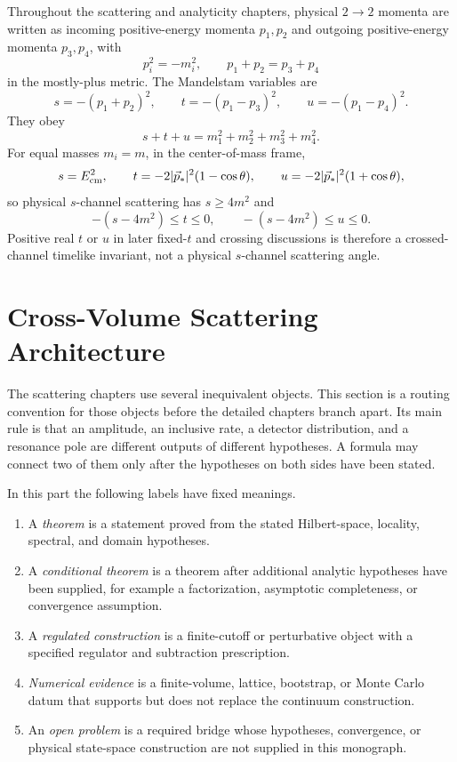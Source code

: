 \begin{definition}
\label{def:mostly-plus-mandelstam-variables}
Throughout the scattering and analyticity chapters, physical \(2\to2\)
momenta are written as incoming positive-energy momenta \(p_1,p_2\) and
outgoing positive-energy momenta \(p_3,p_4\), with
\[
  p_i^2=-m_i^2,
  \qquad
  p_1+p_2=p_3+p_4
\]
in the mostly-plus metric.  The Mandelstam variables are
\[
  s=-(p_1+p_2)^2,\qquad
  t=-(p_1-p_3)^2,\qquad
  u=-(p_1-p_4)^2 .
\]
They obey
\[
  s+t+u=m_1^2+m_2^2+m_3^2+m_4^2 .
\]
For equal masses \(m_i=m\), in the center-of-mass frame,
\[
  s=E_{\rm cm}^2,\qquad
  t=-2|\vec p_*|^2(1-\cos\theta),\qquad
  u=-2|\vec p_*|^2(1+\cos\theta),
\]
so physical \(s\)-channel scattering has \(s\ge4m^2\) and
\[
  -(s-4m^2)\le t\le0,\qquad
  -(s-4m^2)\le u\le0 .
\]
Positive real \(t\) or \(u\) in later fixed-\(t\) and crossing discussions is
therefore a crossed-channel timelike invariant, not a physical
\(s\)-channel scattering angle.
\end{definition}


\section{Cross-Volume Scattering Architecture}
\label{sec:cross-volume-scattering-architecture}

The scattering chapters use several inequivalent objects.  This section is a
routing convention for those objects before the detailed chapters branch
apart.  Its main rule is that an amplitude, an inclusive rate, a detector
distribution, and a resonance pole are different outputs of different
hypotheses.  A formula may connect two of them only after the hypotheses on
both sides have been stated.

\begin{definition}
\label{def:scattering-status-labels}
In this part the following labels have fixed meanings.
\begin{enumerate}
  \item A \emph{theorem} is a statement proved from the stated Hilbert-space,
  locality, spectral, and domain hypotheses.
  \item A \emph{conditional theorem} is a theorem after additional analytic
  hypotheses have been supplied, for example a factorization, asymptotic
  completeness, or convergence assumption.
  \item A \emph{regulated construction} is a finite-cutoff or perturbative
  object with a specified regulator and subtraction prescription.
  \item \emph{Numerical evidence} is a finite-volume, lattice, bootstrap, or
  Monte Carlo datum that supports but does not replace the continuum
  construction.
  \item An \emph{open problem} is a required bridge whose hypotheses,
  convergence, or physical state-space construction are not supplied in this
  monograph.
\end{enumerate}
\end{definition}

